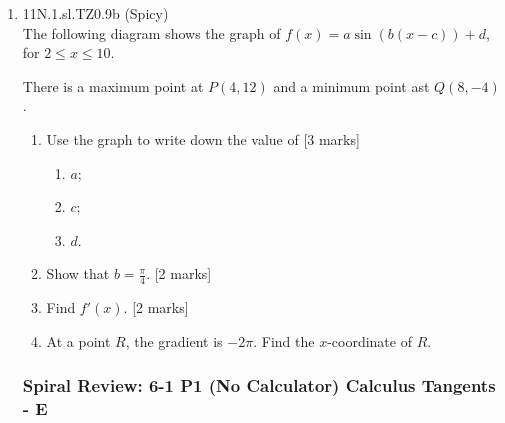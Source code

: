 \documentclass[12pt, twoside]{article}
\begin{document}
\begin{enumerate}
  \item 11N.1.sl.TZ0.9b (Spicy)\\
  The following diagram shows the graph of $f(x)=a \sin (b(x-c))+d$, for $2 \leq x \leq 10$.
    \begin{center}
    \end{center}
    There is a maximum point at $P(4,12)$ and a minimum point ast $Q(8, -4)$.
    \begin{enumerate}
      \item Use the graph to write down the value of [3 marks]
        \begin{enumerate}
          \item $a$;
          \item $c$;
          \item $d$.
        \end{enumerate}
      \item Show that $b= \frac{\pi}{4}$. [2 marks]
      \item Find $f'(x)$. [2 marks]
      \item At a point $R$, the gradient is $-2 \pi$. Find the $x$-coordinate of $R$.
    \end{enumerate}

\newpage
\setcounter{enumi}{0}
\subsubsection*{Spiral Review: 6-1 P1 (No Calculator) Calculus Tangents - E}


\end{enumerate}
\end{document}
